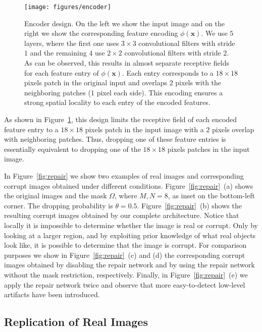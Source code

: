 \documentclass[10pt,twocolumn,letterpaper]{article}
\begin{document}
\begin{figure}[t]
\begin{center}
	\texttt{[image: figures/encoder]}%
\end{center}
   \caption{Encoder design. On the left we show the input image and on the right we show the corresponding feature encoding $\phi(\mathbf{x})$. We use $5$ layers, where the first one uses $3\times 3$ convolutional filters with stride $1$ and the remaining $4$ use $2\times 2$ convolutional filters with stride $2$. As can be observed, this results in almost separate receptive fields for each feature entry of $\phi(\mathbf{x})$. Each entry corresponds to a $18\times 18$ pixels patch in the original input and overlaps $2$ pixels with the neighboring patches ($1$ pixel each side). This encoding ensures a strong spatial locality to each entry of the encoded features.}
\label{fig:encoder}
\end{figure}
As shown in Figure~\ref{fig:encoder}, this design limits the receptive field of each encoded feature entry to a $18\times 18$ pixels patch in the input image with a $2$ pixels overlap with neighboring patches. Thus, dropping one of these feature entries is essentially equivalent to dropping one of the $18\times 18$ pixels patches in the input image.

In Figure~\ref{fig:repair} we show two examples of real images and corresponding corrupt images obtained under different conditions. Figure~\ref{fig:repair}~(a) shows the original images and the mask $\Omega$, where $M,N=8$, as inset on the bottom-left corner. The dropping probability is $\theta=0.5$. Figure~\ref{fig:repair}~(b) shows the resulting corrupt images obtained by our complete architecture. Notice that locally it is impossible to determine whether the image is real or corrupt. Only by looking at a larger region, and by exploiting prior knowledge of what real objects look like, it is possible to determine that the image is corrupt. For comparison purposes we show in Figure~\ref{fig:repair}~(c) and (d) the corresponding corrupt images obtained by disabling the repair network and by using the repair network without the mask restriction, respectively. Finally, in Figure~\ref{fig:repair}~(e) we apply the repair network twice and observe that more easy-to-detect low-level artifacts have been introduced.



\subsection{Replication of Real Images}
\label{sec:replica}
\end{document}
